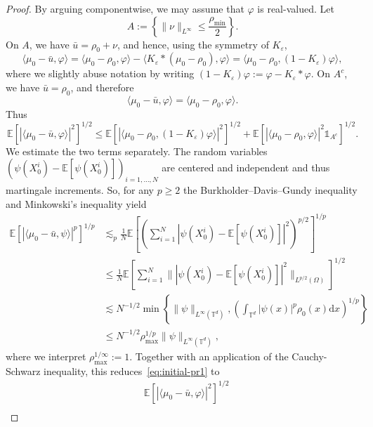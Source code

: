 \documentclass[a4paper,12pt]{article}
\newcommand{\mathd}{\mathrm{d}}
\newcommand{\T}{\mathbb{T}}
\begin{document}
\begin{proof}
By arguing componentwise, we may assume that $\varphi$ is real-valued. Let
\[
        A :=\left\{ \|\nu\|_{L^\infty} \le \frac{\rho_{\min}}{2}\right\}.
\]
On $A$, we have \(\bar{u}=\rho_0+\nu\), and hence, using the symmetry of \(K_\varepsilon\),
\[
        \langle \mu_0-\bar{u},\varphi\rangle
        =
        \langle \mu_0-\rho_0,\varphi\rangle
        -
        \langle K_\varepsilon*(\mu_0-\rho_0),\varphi\rangle
        =
        \langle \mu_0-\rho_0,(1-K_\varepsilon)\varphi\rangle,
\]
where we slightly abuse notation by writing $(1-K_\varepsilon)\varphi:=\varphi-K_\varepsilon\ast \varphi$. On $A^c$, we have \(\bar{u}=\rho_0\), and therefore
\[
        \langle \mu_0-\bar{u},\varphi\rangle
        =
        \langle \mu_0-\rho_0,\varphi\rangle .
\]
Thus
\begin{equation}\label{eq:initial-pr1}
        \mathbb{E}\left[\left|\langle \mu_0-\bar{u},\varphi\rangle\right|^2\right]^{1/2}
        \leq \mathbb{E}\left[\left|\langle \mu_0-\rho_0,(1-K_\varepsilon)\varphi\rangle\right|^2\right]^{1/2} +
        \mathbb{E}\left[\left|\langle \mu_0-\rho_0,\varphi\rangle\right|^2\mathds{1}_{A^c}\right]^{1/2}.
\end{equation}
We estimate the two terms separately. The random variables $(\psi(X^i_0) - \mathbb E[\psi(X^i_0)])_{i=1,\dots, N}$ are centered and independent and thus martingale increments. So, for any $p\geq 2$ the Burkholder--Davis--Gundy inequality and Minkowski's inequality yield
\begin{align*}
    \mathbb E[|\langle \mu_0 - \bar{u},\psi\rangle|^p]^{1/p} & \lesssim_p \frac1N \mathbb E\left[\left( \sum_{i=1}^N |\psi(X^i_0) - \mathbb E[\psi(X^i_0)]|^2\right)^{p/2}\right]^{1/p}\\
    & \leq \frac1N \mathbb E\left[\sum_{i=1}^N \||\psi(X^i_0) - \mathbb E[\psi(X^i_0)]|^2\|_{L^{p/2}(\Omega)}\right]^{1/2} \\
    & \lesssim N^{-1/2} \min\left\{\|\psi\|_{L^\infty(\mathbb T^d)}, \left(\int_{\T^d}|\psi(x)|^p\rho_0(x) \mathd x\right)^{1/p}\right\} \\
    & \leq N^{-1/2} \rho_{\max}^{1/p} \|\psi\|_{L^\infty(\mathbb T^d)},
\end{align*}
where we interpret $\rho_{\max}^{1/\infty}:=1$. Together with an application of the Cauchy-Schwarz inequality, this reduces~\eqref{eq:initial-pr1} to
\begin{align} \nonumber
            &\mathbb{E}\left[\left|\langle \mu_0-\bar{u},\varphi\rangle\right|^2\right]^{1/2}\\ \nonumber

\end{align}
\end{proof}
\end{document}
